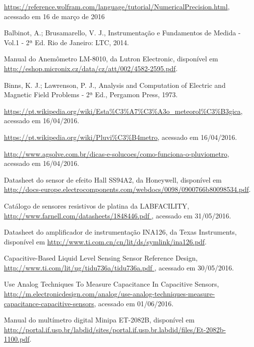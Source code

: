 \documentclass[a4paper]{instrumentacao}
\begin{document}
\newpage
\begin{thebibliography}{9}
 \url{https://reference.wolfram.com/language/tutorial/NumericalPrecision.html}, acessado em 16 de março de 2016

  Balbinot, A.; Brusamarello, V. J., Instrumentação e Fundamentos de Medida - Vol.1 - 2ª Ed. Rio de Janeiro: LTC, 2014.

 Manual do Anemômetro LM-8010, da Lutron Electronic, disponível em \url{http://eshop.micronix.cz/data/cz/att/002/4582-2595.pdf}.

 Binns, K. J.; Lawrenson, P. J., Analysis and Computation of Electric and Magnetic Field Problems - 2ª Ed., Pergamon Press, 1973.

 \url{https://pt.wikipedia.org/wiki/Esta\%C3\%A7\%C3\%A3o_meteorol\%C3\%B3gica}, acessado em 16/04/2016.

 \url{https://pt.wikipedia.org/wiki/Pluvi\%C3\%B4metro}, acessado em 16/04/2016.

 \url{http://www.agsolve.com.br/dicas-e-solucoes/como-funciona-o-pluviometro}, acessado em 16/04/2016.

 Datasheet do sensor de efeito Hall SS94A2, da Honeywell, disponível em \url{http://docs-europe.electrocomponents.com/webdocs/0098/0900766b80098534.pdf}.

 Catálogo de sensores resistivos de platina da LABFACILITY, \url{http://www.farnell.com/datasheets/1848446.pdf }, acessado em 31/05/2016.

 Datasheet do amplificador de instrumentação INA126, da Texas Instruments, disponível em \url{http://www.ti.com.cn/cn/lit/ds/symlink/ina126.pdf}.

 Capacitive-Based Liquid Level Sensing Sensor Reference Design, \url{http://www.ti.com/lit/ug/tidu736a/tidu736a.pdf
}, acessado em 30/05/2016.

 Use Analog Techniques To Measure Capacitance In Capacitive Sensors, \url{http://m.electronicdesign.com/analog/use-analog-techniques-measure-capacitance-capacitive-sensors}, acessado em 01/06/2016.

 Manual do multímetro digital Minipa ET-2082B, disponível em \url{http://portal.if.usp.br/labdid/sites/portal.if.usp.br.labdid/files/Et-2082b-1100.pdf}.


\end{thebibliography}
\end{document}
